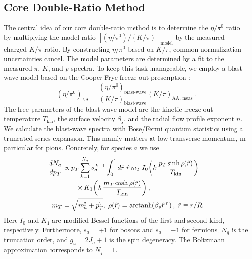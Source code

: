 \documentclass[%
 reprint,
 amsmath,amssymb,
 aps,
prc,
]{revtex4-2}
\begin{document}
\subsection{Core Double-Ratio Method}
The central idea of our core double-ratio method is to determine the $\eta/\pi^0$ ratio by multiplying the model ratio $[(\eta/\pi^0)/(K/\pi)]_\mathrm{model}$ by the measured charged $K/\pi$ ratio. By constructing $\eta/\pi^0$ based on $K/\pi$, common normalization uncertainties cancel. The model parameters are determined by a fit to the measured $\pi$, $K$, and $p$ spectra. To keep this task manageable, we employ a blast-wave model \cite{Schnedermann:1992ra,Schnedermann:1993ws} based on the Cooper-Frye freeze-out prescription \cite{Cooper:1974mv}:
\begin{equation}
\left(\eta/\pi^0\right)_{\mathrm{AA}}
=
\frac{\left(\eta/\pi^0\right)_{\mathrm{blast\text{-}wave}}}
     {\left(K/\pi\right)_{\mathrm{blast\text{-}wave}}}
\left(K/\pi\right)_{\mathrm{AA,\,meas}} \, .
\label{eq:eta_to_pi0_ratio_from_data_and_blastwave}
\end{equation}
The free parameters of the blast-wave model are the kinetic freeze-out temperature $T_\mathrm{kin}$, the surface velocity $\beta_s$, and the radial flow profile exponent $n$. We calculate the blast-wave spectra with Bose/Fermi quantum statistics using a truncated series expansion. This mainly matters at low transverse momentum, in particular for pions. Concretely, for species $a$ we use
\begin{align}
\frac{dN_a}{dp_T}
&\propto
p_T \sum_{k=1}^{N_q} s_a^{\,k-1}
\int_0^1 d\hat r\;\hat r\, m_T\,
I_0\!\left(k\,\frac{p_T\sinh\rho(\hat r)}{T_\mathrm{kin}}\right)
\notag\\[-0.2em]
&\qquad\times
K_1\!\left(k\,\frac{m_T\cosh\rho(\hat r)}{T_\mathrm{kin}}\right),
\\
m_T&=\sqrt{m_a^2+p_T^2},\;
\rho(\hat r)=\mathrm{arctanh}\!\left(\beta_s \hat r^{\,n}\right),\;
\hat r\equiv r/R .
\end{align}
Here $I_0$ and $K_1$ are modified Bessel functions of the first and second kind, respectively. Furthermore, $s_a=+1$ for bosons and $s_a=-1$ for fermions, $N_q$ is the truncation order, and $g_a=2J_a+1$ is the spin degeneracy. The Boltzmann approximation corresponds to $N_q=1$.
\end{document}
